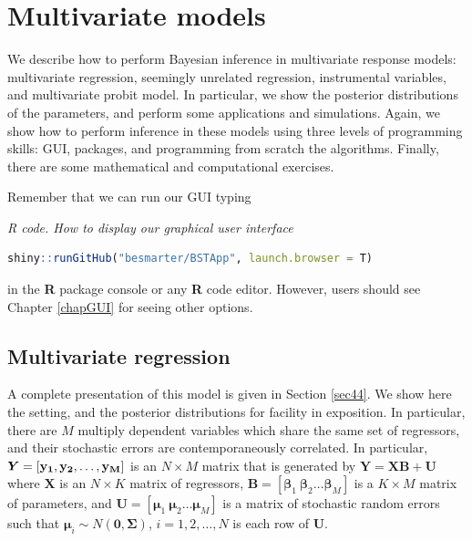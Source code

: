 \chapter{Multivariate models}\label{chap7}

We describe how to perform Bayesian inference in multivariate response models: multivariate regression, seemingly unrelated regression, instrumental variables, and multivariate probit model. In particular, we show the posterior distributions of the parameters, and perform some applications and simulations. Again, we show how to perform inference in these models using three levels of programming skills: GUI, packages, and programming from scratch the algorithms. Finally, there are some mathematical and computational exercises.

Remember that we can run our GUI typing

\begin{tcolorbox}[enhanced,width=4.67in,center upper,
	fontupper=\large\bfseries,drop shadow southwest,sharp corners]
	\textit{R code. How to display our graphical user interface}
	\begin{VF}
		\begin{lstlisting}[language=R]
	shiny::runGitHub("besmarter/BSTApp", launch.browser = T)
\end{lstlisting}
	\end{VF}
\end{tcolorbox} 

in the \textbf{R} package console or any \textbf{R} code editor. However, users should see Chapter \ref{chapGUI} for seeing other options.

\section{Multivariate regression}\label{sec71}

A complete presentation of this model is given in Section \ref{sec44}. We show here the setting, and the posterior distributions for facility in exposition. In particular, there are $M$ multiply dependent variables which share the same set of regressors, and their stochastic errors are contemporaneously correlated. In particular, $\bm{Y}=\left[{\bf{y_{1}}},{\bf{y_{2}}},\ldots,{\bf{y_{M}}}\right]$ is an $ N\times M$ matrix that is generated by $\bm{Y}=\bm{X}\bm{B}+\bm{U}$ where $\bm{X}$ is an $ N\times K$ matrix of regressors, $\bm{B}=\left[\bm{\beta}_{1} \ \bm{\beta}_{2} \ldots \bm{\beta}_{M}\right]$ is a $ K\times M$ matrix of parameters, and $\bm{U}=\left[\bm{\mu}_{1} \ \bm{\mu}_{2}\ldots \bm{\mu}_{M}\right]$ is a matrix of stochastic random errors such that $\bm{\mu}_i\sim{N}(\bm{0},\bm{\Sigma})$, $i=1,2,\dots,N$ is each row of $\bm{U}$.

